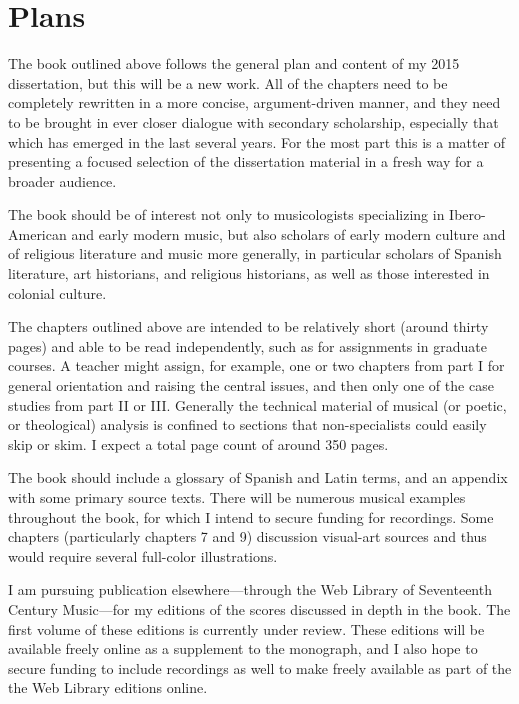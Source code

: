 \documentclass[tt]{vcbook-proposal}
\begin{document}
\section{Plans}

The book outlined above follows the general plan and content of my 2015 dissertation, but this will be a new work.
All of the chapters need to be completely rewritten in a more concise, argument-driven manner, and they need to be brought in ever closer dialogue with secondary scholarship, especially that which has emerged in the last several years.
For the most part this is a matter of presenting a focused selection of the dissertation material in a fresh way for a broader audience.

The book should be of interest not only to musicologists specializing in Ibero-American and early modern music, but also scholars of early modern culture and of religious literature and music more generally, in particular scholars of Spanish literature, art historians, and religious historians, as well as those interested in colonial culture.

The chapters outlined above are intended to be relatively short (around thirty pages) and able to be read independently, such as for assignments in graduate courses.
A teacher might assign, for example, one or two chapters from part I for general orientation and raising the central issues, and then only one of the case studies from part II or III.
Generally the technical material of musical (or poetic, or theological) analysis is confined to sections that non-specialists could easily skip or skim.
I expect a total page count of around 350 pages.

The book should include a glossary of Spanish and Latin terms, and an appendix with some primary source texts.
There will be numerous musical examples throughout the book, for which I intend to secure funding for recordings.
Some chapters (particularly chapters 7 and 9) discussion visual-art sources and thus would require several full-color illustrations.

I am pursuing publication elsewhere---through the Web Library of Seventeenth Century Music---for my editions of the scores discussed in depth in the book. 
The first volume of these editions is currently under review.
These editions will be available freely online as a supplement to the monograph, and I also hope to secure funding to include recordings as well to make freely available as part of the the Web Library editions online.



\printbibliography
\end{document}
